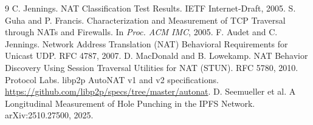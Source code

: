 \documentclass[11pt]{article}
\begin{document}
\begin{thebibliography}{9}
 C. Jennings. NAT Classification Test Results. IETF Internet-Draft, 2005.
 S. Guha and P. Francis. Characterization and Measurement of TCP Traversal through
  NATs and Firewalls. In \emph{Proc. ACM IMC}, 2005.
 F. Audet and C. Jennings. Network Address Translation (NAT) Behavioral Requirements
  for Unicast UDP. RFC 4787, 2007.
 D. MacDonald and B. Lowekamp. NAT Behavior Discovery Using Session Traversal
  Utilities for NAT (STUN). RFC 5780, 2010.
 Protocol Labs. libp2p AutoNAT v1 and v2 specifications.
  \url{https://github.com/libp2p/specs/tree/master/autonat}.
 D. Seemueller et al. A Longitudinal Measurement of Hole Punching in the IPFS Network.
  arXiv:2510.27500, 2025.
\end{thebibliography}
\end{document}
